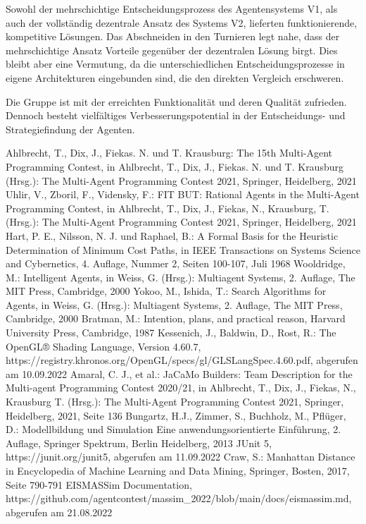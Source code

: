 \documentclass[runningheads]{llncs}
\begin{document}
	Sowohl der mehrschichtige Entscheidungsprozess des Agentensystems V1, als auch der vollständig dezentrale Ansatz des Systems V2, lieferten funktionierende, kompetitive Lösungen. Das Abschneiden in den Turnieren legt nahe, dass der mehrschichtige Ansatz Vorteile gegenüber der dezentralen Lösung birgt. Dies bleibt aber eine Vermutung, da die unterschiedlichen Entscheidungsprozesse in eigene Architekturen eingebunden sind, die den direkten Vergleich erschweren.
	
	Die Gruppe ist mit der erreichten Funktionalität und deren Qualität zufrieden. Dennoch besteht vielfältiges Verbesserungspotential in der Entscheidungs- und Strategiefindung der Agenten.
	
	\newpage\begin{thebibliography}{8}
		Ahlbrecht, T., Dix, J., Fiekas. N. und T. Krausburg: The 15th Multi-Agent Programming Contest, in Ahlbrecht, T., Dix, J., Fiekas. N. und T. Krausburg (Hrsg.): The Multi-Agent Programming Contest 2021, Springer, Heidelberg, 2021
		Uhlir, V., Zboril, F., Vidensky, F.: FIT BUT: Rational Agents in the Multi-Agent Programming Contest, in Ahlbrecht, T., Dix, J., Fiekas, N., Krausburg, T. (Hrsg.): The Multi-Agent Programming Contest 2021, Springer, Heidelberg, 2021
		Hart, P. E., Nilsson, N. J. und Raphael, B.: A Formal Basis for the Heuristic Determination of Minimum Cost Paths, in IEEE Transactions on Systems Science and Cybernetics, 4. Auflage, Nummer 2, Seiten 100-107, Juli 1968
		Wooldridge, M.: Intelligent Agents, in Weiss, G. (Hrsg.): Multiagent Systems, 2. Auflage, The MIT Press, Cambridge, 2000
		Yokoo, M., Ishida, T.: Search Algorithms for Agents, in Weiss, G. (Hrsg.): Multiagent Systems, 2. Auflage, The MIT Press, Cambridge, 2000
		Bratman, M.: Intention, plans, and practical reason, Harvard University Press, Cambridge, 1987
		Kessenich, J., Baldwin, D., Rost, R.: The OpenGL® Shading Language, Version 4.60.7, https://registry.khronos.org/OpenGL/specs/gl/GLSLangSpec.4.60.pdf, abgerufen am 10.09.2022
		Amaral, C. J., et al.: JaCaMo Builders: Team Description for the Multi-agent Programming Contest 2020/21, in  Ahlbrecht, T., Dix, J., Fiekas, N., Krausburg T. (Hrsg.): The Multi-Agent Programming Contest 2021, Springer, Heidelberg, 2021, Seite 136
		Bungartz, H.J., Zimmer, S., Buchholz, M., Pflüger, D.: Modellbildung und Simulation Eine anwendungsorientierte Einführung, 2. Auflage, Springer Spektrum, Berlin Heidelberg, 2013
		JUnit 5, https://junit.org/junit5, abgerufen am 11.09.2022
		Craw, S.: Manhattan Distance in Encyclopedia of Machine Learning and Data Mining, Springer, Bosten, 2017, Seite 790-791
		EISMASSim Documentation, \\ https://github.com/agentcontest/massim\_2022/blob/main/docs/eismassim.md, abgerufen am 21.08.2022
	\end{thebibliography}
\end{document}
